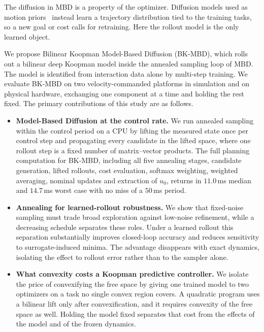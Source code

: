 \documentclass[letterpaper,10pt,conference]{ieeeconf}
\newcommand{\bkmbd}{\textsc{BK-MBD}}
\begin{document}
The diffusion in MBD is a property of the optimizer.
Diffusion models used as motion priors~\cite{janner2022planning, chi2025diffusion, carvalho2023motion} instead learn a trajectory distribution tied to the training tasks, so a new goal or cost calls for retraining.
Here the rollout model is the only learned object.

We propose Bilinear Koopman Model-Based Diffusion (\bkmbd{}), which rolls out a bilinear deep Koopman model inside the annealed sampling loop of MBD.
The model is identified from interaction data alone by multi-step training.
We evaluate \bkmbd{} on two velocity-commanded platforms in simulation and on physical hardware, exchanging one component at a time and holding the rest fixed.
The primary contributions of this study are as follows.

\begin{itemize}
\item \textbf{Model-Based Diffusion at the control rate.}
We run annealed sampling within the control period on a CPU by lifting the measured state once per control step and propagating every candidate in the lifted space, where one rollout step is a fixed number of matrix--vector products.
The full planning computation for \bkmbd{}, including all five annealing stages, candidate generation, lifted rollouts, cost evaluation, softmax weighting, weighted averaging, nominal updates and extraction of $u_0$, returns in $11.0$\,ms median and $14.7$\,ms worst case with no miss of a $50$\,ms period.

\item \textbf{Annealing for learned-rollout robustness.}
We show that fixed-noise sampling must trade broad exploration against low-noise refinement, while a decreasing schedule separates these roles.
Under a learned rollout this separation substantially improves closed-loop accuracy and reduces sensitivity to surrogate-induced minima.
The advantage disappears with exact dynamics, isolating the effect to rollout error rather than to the sampler alone.

\item \textbf{What convexity costs a Koopman predictive controller.}
We isolate the price of convexifying the free space by giving one trained model to two optimizers on a task no single convex region covers.
A quadratic program uses a bilinear lift only after convexification, and it requires convexity of the free space as well.
Holding the model fixed separates that cost from the effects of the model and of the frozen dynamics.
\end{itemize}
\end{document}
